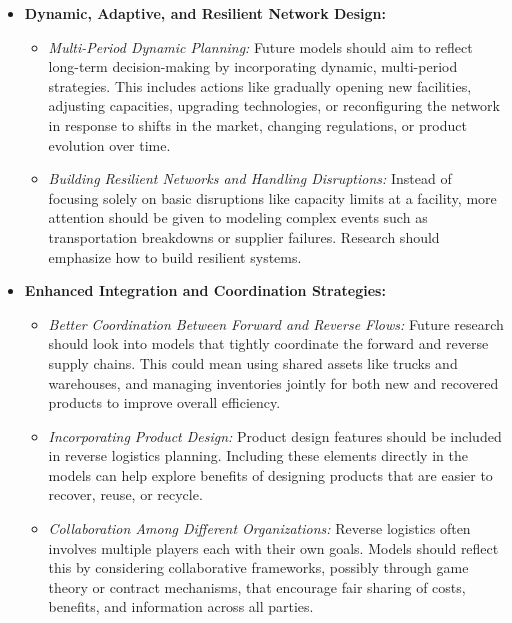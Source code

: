 \begin{itemize}[label=, leftmargin=2mm]
    \item \textbf{Dynamic, Adaptive, and Resilient Network Design:}
        \begin{itemize}
            \item \textit{Multi-Period Dynamic Planning:} Future models should aim to reflect long-term decision-making by incorporating dynamic, multi-period strategies. This includes actions like gradually opening new facilities, adjusting capacities, upgrading technologies, or reconfiguring the network in response to shifts in the market, changing regulations, or product evolution over time.
            \item \textit{Building Resilient Networks and Handling Disruptions:} Instead of focusing solely on basic disruptions like capacity limits at a facility, more attention should be given to modeling complex events such as transportation breakdowns or supplier failures. Research should emphasize how to build resilient systems.
        \end{itemize}

    \item \textbf{Enhanced Integration and Coordination Strategies:}
        \begin{itemize}
            \item \textit{Better Coordination Between Forward and Reverse Flows:} Future research should look into models that tightly coordinate the forward and reverse supply chains. This could mean using shared assets like trucks and warehouses, and managing inventories jointly for both new and recovered products to improve overall efficiency.
            \item \textit{Incorporating Product Design:} Product design features should be included in reverse logistics planning. Including these elements directly in the models can help explore benefits of designing products that are easier to recover, reuse, or recycle.
            \item \textit{Collaboration Among Different Organizations:} Reverse logistics often involves multiple players each with their own goals. Models should reflect this by considering collaborative frameworks, possibly through game theory or contract mechanisms, that encourage fair sharing of costs, benefits, and information across all parties.
        \end{itemize}


\end{itemize}
